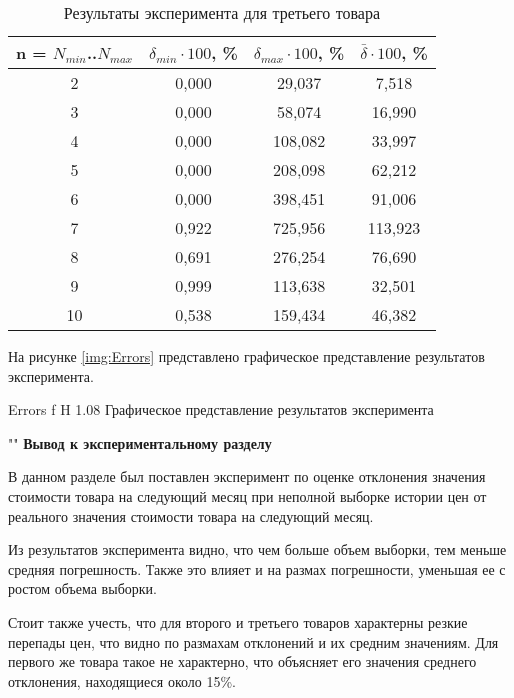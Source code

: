 \documentclass[a4paper]{bmstu}
\begin{document}
\begin{table}[H]
	\caption{Результаты эксперимента для третьего товара}
	\begin{center}
		\begin{tabular}{| c | c | c | c |} 
			\hline
			
			\textbf{n = $N_{min}$..$N_{max}$} & \textbf{$\delta_{min} \cdot 100$, \%} & \textbf{$\delta_{max} \cdot 100$, \%} & \textbf{$\bar{\delta} \cdot 100$, \%} \\   
			
			\hline
			2 & 0,000 & 29,037 & 7,518\\
			\hline
			3 & 0,000 & 58,074 & 16,990\\
			\hline
			4 & 0,000 & 108,082 & 33,997\\
			\hline
			5 & 0,000 & 208,098 & 62,212\\
			\hline
			6 & 0,000 & 398,451 & 91,006\\
			\hline
			7 & 0,922 & 725,956 & 113,923\\
			\hline
			8 & 0,691 & 276,254 & 76,690\\
			\hline
			9 & 0,999 & 113,638 & 32,501\\
			\hline
			10 & 0,538 & 159,434 & 46,382\\
			\hline
		\end{tabular}
	\end{center}
\end{table}

На рисунке \ref{img:Errors} представлено графическое представление результатов эксперимента.
 
{Errors}
{f}
{H}
{1.08\textwidth}
{Графическое представление результатов эксперимента}

""\newline
\noindent\textbf{Вывод к экспериментальному разделу}

В данном разделе был поставлен эксперимент по оценке отклонения значения стоимости товара на следующий месяц при неполной выборке истории цен от реального значения стоимости товара на следующий месяц.

Из результатов эксперимента видно, что чем больше объем выборки, тем меньше средняя погрешность. Также это влияет и на размах погрешности, уменьшая ее с ростом объема выборки. 

Стоит также учесть, что для второго и третьего товаров характерны резкие перепады цен, что видно по размахам отклонений и их средним значениям. Для первого же товара такое не характерно, что объясняет его значения среднего отклонения, находящиеся около 15\%. 
\end{document}
